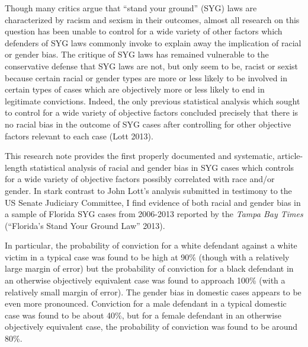 \documentclass[12pt,article]{article}
\begin{document}
Though many critics argue that ``stand your ground'' (SYG) laws are
characterized by racism and sexism in their outcomes, almost all
research on this question has been unable to control for a wide variety
of other factors which defenders of SYG laws commonly invoke to explain
away the implication of racial or gender bias. The critique of SYG laws
has remained vulnerable to the conservative defense that SYG laws are
not, but only seem to be, racist or sexist because certain racial or
gender types are more or less likely to be involved in certain types of
cases which are objectively more or less likely to end in legitimate
convictions. Indeed, the only previous statistical analysis which sought
to control for a wide variety of objective factors concluded precisely
that there is no racial bias in the outcome of SYG cases after
controlling for other objective factors relevant to each case (Lott
2013).

This research note provides the first properly documented and
systematic, article-length statistical analysis of racial and gender
bias in SYG cases which controls for a wide variety of objective factors
possibly correlated with race and/or gender. In stark contrast to John
Lott's analysis submitted in testimony to the US Senate Judiciary
Committee, I find evidence of both racial and gender bias in a sample of
Florida SYG cases from 2006-2013 reported by the \emph{Tampa Bay Times}
(``Florida's Stand Your Ground Law'' 2013).

In particular, the probability of conviction for a white defendant
against a white victim in a typical case was found to be high at 90\%
(though with a relatively large margin of error) but the probability of
conviction for a black defendant in an otherwise objectively equivalent
case was found to approach 100\% (with a relatively small margin of
error). The gender bias in domestic cases appears to be even more
pronounced. Conviction for a male defendant in a typical domestic case
was found to be about 40\%, but for a female defendant in an otherwise
objectively equivalent case, the probability of conviction was found to
be around 80\%.
\end{document}
